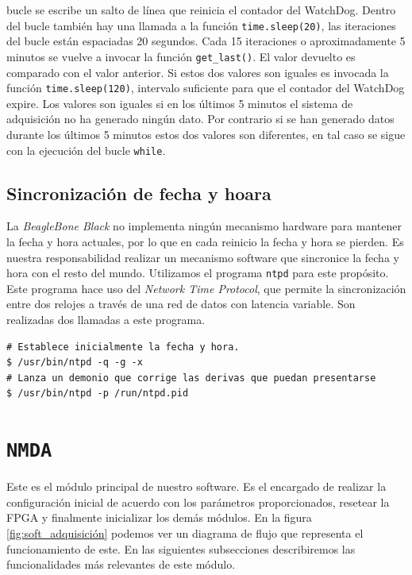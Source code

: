 		bucle se escribe un salto de línea que reinicia el contador del WatchDog. Dentro del bucle también hay una llamada a la función
		\texttt{time.sleep(20)}, las iteraciones del bucle están espaciadas 20 segundos. Cada 15 iteraciones o aproximadamente 5 minutos se
		vuelve a invocar la función \texttt{get\_last()}. El valor devuelto es comparado con el valor anterior. Si estos dos valores son
		iguales es invocada la función \texttt{time.sleep(120)}, intervalo suficiente para que el contador del WatchDog expire. Los valores
		son iguales si en los últimos 5 minutos el sistema de adquisición no ha generado ningún dato. Por contrario si se han generado datos
		durante los últimos 5 minutos estos dos valores son diferentes, en tal caso se sigue con la ejecución del bucle \texttt{while}. 
	\subsection{Sincronización de fecha y hoara}
		La \emph{BeagleBone Black} no implementa ningún mecanismo hardware para mantener la fecha y hora actuales, por lo que en cada reinicio la
		fecha y hora se pierden. Es nuestra responsabilidad realizar un mecanismo software que sincronice la fecha y hora con el resto del
		mundo\cite{ntpd}. Utilizamos el programa \texttt{ntpd} para este propósito. Este programa hace uso del \emph{Network Time
		Protocol}\cite{ntpWiki}, que permite la sincronización entre dos relojes a través de una red de datos con latencia variable. Son
		realizadas dos llamadas a este programa.
		\begin{lstlisting}[style=myBash]
# Establece inicialmente la fecha y hora.
$ /usr/bin/ntpd -q -g -x
# Lanza un demonio que corrige las derivas que puedan presentarse
$ /usr/bin/ntpd -p /run/ntpd.pid
		\end{lstlisting}

\section{\texttt{NMDA}}
	Este es el módulo principal de nuestro software. Es el encargado de realizar la configuración inicial de acuerdo con los parámetros
	proporcionados, resetear la FPGA y finalmente inicializar los demás módulos. En la figura \ref{fig:soft_adquisición} podemos ver un diagrama
	de flujo que representa el funcionamiento de este. En las siguientes subsecciones describiremos las funcionalidades más relevantes de este
	módulo.
